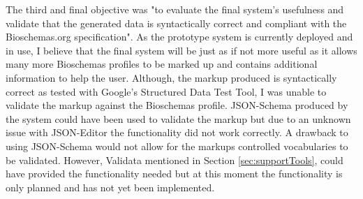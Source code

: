 {The third and final objective was "to evaluate the final system's usefulness and validate that the generated data is syntactically correct and compliant with the Bioschemas.org specification". As the prototype system is currently deployed and in use, I believe that the final system will be just as if not more useful as it allows many more Bioschemas profiles to be marked up and contains additional information to help the user. Although, the markup produced is syntactically correct as tested with Google's Structured Data Test Tool, I was unable to validate the markup against the Bioschemas profile. JSON-Schema produced by the system could have been used to validate the markup but due to an unknown issue with JSON-Editor the functionality did not work correctly. A drawback to using JSON-Schema would not allow for the markups controlled vocabularies to be validated. However, Validata mentioned in Section \ref{sec:supportTools}, could have provided the functionality needed but at this moment the functionality is only planned and has not yet been implemented.


}
